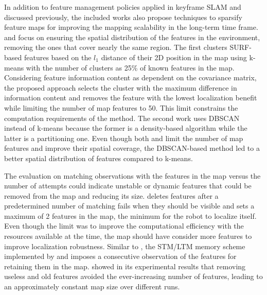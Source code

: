 In addition to feature management policies applied in keyframe SLAM and discussed previously, the included works also propose techniques to sparsify feature maps for improving the mapping scalability in the long-term time frame.
\cite{hochdorfer-schlegel:2009} and \cite{hochdorfer-et-al:2009:5339626} focus on ensuring the spatial distribution of the features in the environment, removing the ones that cover nearly the same region.
The first clusters SURF-based features based on the $l_1$ distance of their 2D position in the map using k-means with the number of clusters as 25\% of known features in the map. Considering feature information content as dependent on the covariance matrix, the proposed approach selects the cluster with the maximum difference in information content and removes the feature with the lowest localization benefit while limiting the number of map features to 50. This limit constrains the computation requirements of the method. The second work uses DBSCAN instead of k-means because the former is a density-based algorithm while the latter is a partitioning one. Even though both \cite{hochdorfer-schlegel:2009} and \cite{hochdorfer-et-al:2009:5339626} limit the number of map features and improve their spatial coverage, the DBSCAN-based method led to a better spatial distribution of features compared to k-means.

The evaluation on matching observations with the features in the map versus the number of attempts could indicate unstable or dynamic features that could be removed from the map and reducing its size.
\cite{davison-murray:2002:1017615} deletes features after a predetermined number of matching fails when they should be visible and sets a maximum of 2 features in the map, the minimum for the robot to localize itself. Even though the limit was to improve the computational efficiency with the resources available at the time, the map should have consider more features to improve localization robustness.
Similar to \cite{davison-murray:2002:1017615}, the STM/LTM memory scheme implemented by \cite{dayoub-et-al:2011:013} and \cite{bacca-et-al:2013:003} imposes a consecutive observation of the features for retaining them in the map. \cite{bacca-et-al:2013:003} showed in its experimental results that removing useless and old features avoided the ever-increasing number of features, leading to an approximately constant map size over different runs.

